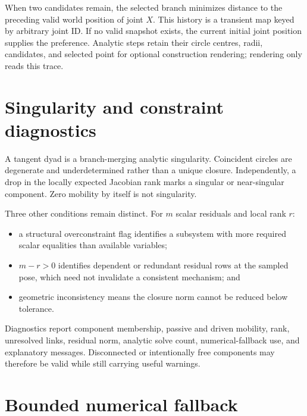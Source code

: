 \documentclass[11pt]{article}
\begin{document}
When two candidates remain, the selected branch minimizes distance to the
preceding valid world position of joint $X$. This history is a transient map
keyed by arbitrary joint ID. If no valid snapshot exists, the current initial
joint position supplies the preference. Analytic steps retain their circle
centres, radii, candidates, and selected point for optional construction
rendering; rendering only reads this trace.

\section{Singularity and constraint diagnostics}

A tangent dyad is a branch-merging analytic singularity. Coincident circles are
degenerate and underdetermined rather than a unique closure. Independently, a
drop in the locally expected Jacobian rank marks a singular or near-singular
component. Zero mobility by itself is not singularity.

Three other conditions remain distinct. For $m$ scalar residuals and local rank
$r$:
\begin{itemize}
  \item a structural overconstraint flag identifies a subsystem with more
    required scalar equalities than available variables;
  \item $m-r>0$ identifies dependent or redundant residual rows at the sampled
    pose, which need not invalidate a consistent mechanism; and
  \item geometric inconsistency means the closure norm cannot be reduced below
    tolerance.
\end{itemize}
Diagnostics report component membership, passive and driven mobility, rank,
unresolved links, residual norm, analytic solve count, numerical-fallback use,
and explanatory messages. Disconnected or intentionally free components may
therefore be valid while still carrying useful warnings.

\section{Bounded numerical fallback}
\end{document}
